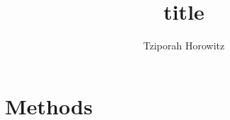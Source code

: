 \documentclass[letterpaper,man,natbib,donotrepeattitle]{apa6}
\title{title}  %
\author{Tziporah Horowitz}
\affiliation{Johns Hopkins University}
\begin{document}
\maketitle



\section{Methods}\label{sec:methods}






\appendix
\section{}\label{sec:appendix}

%
\end{document}
